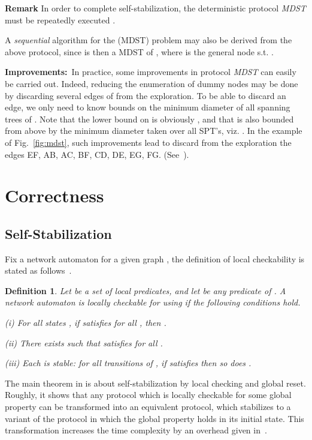 \documentclass[10pt]{article}
\newtheorem{defi}{Definition}[section]
\newenvironment{rmk}{\begin{trivlist}
                       \item[]\hspace{0cm}\textbf{Remark}}{
                       \end{trivlist}}
\begin{document}
\begin{rmk}
In order to complete self-stabilization, the deterministic protocol
{\em MDST} must be repeatedly executed .

A {\em sequential} algorithm for the (MDST) problem may also be
derived from the above protocol, since  is then a MDST of ,
where  is the general node s.t. .
\end{rmk}

\noindent
{\bf Improvements:}\, In practice, some improvements in protocol {\em MDST}
can easily be carried out. Indeed, reducing the enumeration of dummy nodes
may be done by discarding several edges of  from the exploration.
To be able to discard an edge, we only need to know bounds on the minimum
diameter  of all spanning trees of . Note that the lower bound on
 is obviously , and that  is also bounded from above by the
minimum diameter taken over all SPT's, viz. . In the example of Fig.~\ref{fig:mdst}, such
improvements lead to discard from the exploration the edges
EF, AB, AC, BF, CD, DE, EG, FG. (See~\cite{BuBL95}).

\section{Correctness}
\subsection{Self-Stabilization}\label{ss}
Fix a network automaton  for a given graph , the definition of
local checkability is stated as follows~\cite{APVD94}.

\begin{defi}\label{def:local}
Let  be a set of local predicates, and let 
be any predicate of . A network automaton  is locally
checkable for  using  if the following conditions hold.

(i) For all states , if  satisfies  for all
, then .

(ii) There exists  such that  satisfies 
for all .

(iii) Each  is stable: for all transitions
 of , if  satisfies  then so does .
\end{defi}

The main theorem in \cite{APVD94} is about self-stabilization by local
checking and global reset. Roughly, it shows that any protocol which
is locally checkable for some global property can be transformed into
an equivalent protocol, which stabilizes to a variant of the protocol
in which the global property holds in its initial state. This
transformation increases the time complexity by an overhead given
in~\cite[Theorem 10]{APVD94}.
\end{document}
